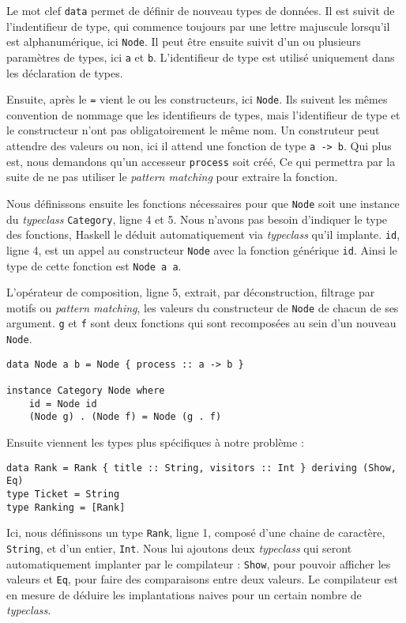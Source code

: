 \documentclass{llncs}
\begin{document}
Le mot clef \lstinline{data} permet de définir de nouveau types de données.
Il est suivit de l'indentifieur de type, qui commence toujours par une lettre
majuscule lorsqu'il est alphanumérique, ici \lstinline{Node}.
Il peut être ensuite suivit d'un ou plusieurs paramètres de types, ici
\lstinline{a} et \lstinline{b}.
L'identifieur de type est utilisé uniquement dans les déclaration de types.

Ensuite, après le \lstinline{=} vient le ou les constructeurs, ici \lstinline{Node}.
Ils suivent les mêmes convention de nommage que les identifieurs de types, mais
l'identifieur de type et le constructeur n'ont pas obligatoirement le même nom.
Un construteur peut attendre des valeurs ou non, ici il attend une fonction de
type \lstinline{a -> b}.
Qui plus est, nous demandons qu'un accesseur \lstinline{process} soit créé,
Ce qui permettra par la suite de ne pas utiliser le \emph{pattern matching} pour
extraire la fonction.

Nous définissons ensuite les fonctions nécessaires pour que \lstinline{Node} soit
une instance du \emph{typeclass} \lstinline{Category}, ligne 4 et 5.
Nous n'avons pas besoin d'indiquer le type des fonctions, Haskell le déduit automatiquement
via \emph{typeclass} qu'il implante.
\lstinline{id}, ligne 4, est un appel au constructeur \lstinline{Node} avec la
fonction générique \lstinline{id}.
Ainsi le type de cette fonction est \lstinline{Node a a}.

L'opérateur de composition, ligne 5, extrait, par déconstruction, filtrage par motifs
ou \emph{pattern matching}, les valeurs du constructeur de \lstinline{Node} de chacun de ses argument.
\lstinline{g} et \lstinline{f} sont deux fonctions qui sont recomposées au sein
d'un nouveau \lstinline{Node}.

\begin{lstlisting}
data Node a b = Node { process :: a -> b }

instance Category Node where
    id = Node id
    (Node g) . (Node f) = Node (g . f)
\end{lstlisting}

Ensuite viennent les types plus spécifiques à notre problème :

\begin{lstlisting}
data Rank = Rank { title :: String, visitors :: Int } deriving (Show, Eq)
type Ticket = String
type Ranking = [Rank]
\end{lstlisting}

Ici, nous définissons un type \lstinline{Rank}, ligne 1,
composé d'une chaine de caractère, \lstinline{String}, et d'un entier, \lstinline{Int}.
Nous lui ajoutons deux \emph{typeclass} qui seront automatiquement implanter par
le compilateur : \lstinline{Show}, pour pouvoir afficher les valeurs et \lstinline{Eq},
pour faire des comparaisons entre deux valeurs.
Le compilateur est en mesure de déduire les implantations naives pour un certain
nombre de \emph{typeclass}.
\end{document}
